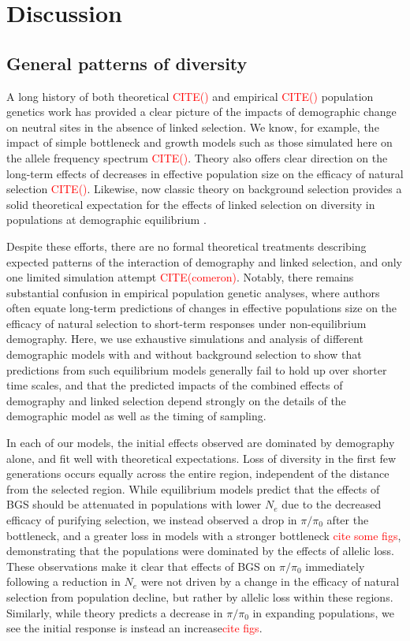 \documentclass[9pt,twocolumn,twoside]{rilabRxiv}
\newcommand{\jri}[1]{{\small \textcolor{red}{#1}}}
\newcommand{\citex}[1]{{\small \textcolor{red}{CITE(#1)}}}
\begin{document}
\section{Discussion}

\subsection{General patterns of diversity}

A long history of both theoretical \citex{} and empirical \citex{} population genetics work has provided a clear picture of the impacts of demographic change on neutral sites in the absence of linked selection.
We know, for example, the impact of simple bottleneck and growth models such as those simulated here on the allele frequency spectrum \citex{}.
Theory also offers clear direction on the long-term effects of decreases in effective population size on the efficacy of natural selection \citex{}.
Likewise, now classic theory on background selection provides a solid theoretical expectation for the effects of linked selection on diversity in populations at demographic equilibrium \citep{inordborg1996effect}.

Despite these efforts, there are no formal theoretical treatments describing expected patterns of the interaction of demography and linked selection, and only one limited simulation attempt \citex{comeron}.
Notably, there remains substantial confusion in empirical population genetic analyses, where authors often equate long-term predictions of changes in effective populations size on the efficacy of natural selection to short-term responses under non-equilibrium demography.
Here, we use exhaustive simulations and analysis of different demographic models with and without background selection to show that predictions from such equilibrium models generally fail to hold up over shorter time scales, and that the predicted impacts of the combined effects of demography and linked selection depend strongly on the details of the demographic model as well as the timing of sampling.

In each of our models, the initial effects observed are dominated by demography alone, and fit well with theoretical expectations.
Loss of diversity in the first few generations occurs equally across the entire region, independent of the distance from the selected region.
While equilibrium models predict that the effects of BGS should be attenuated in populations with lower $N_e$ due to the decreased efficacy of purifying selection, we instead observed a drop in $\pi/\pi_0$  after the bottleneck, and a greater loss in models with a stronger bottleneck \jri{cite some figs}, demonstrating that the populations were dominated by the effects of allelic loss.
These observations make it clear that effects of BGS on $\pi/\pi_0$ immediately following a reduction in $N_e$ were not driven by a change in the efficacy of natural selection from population decline, but rather by allelic loss within these regions.
Similarly, while theory predicts a decrease in $\pi/\pi_0$ in expanding populations, we see the initial response is instead an increase\jri{cite figs}.
\end{document}
